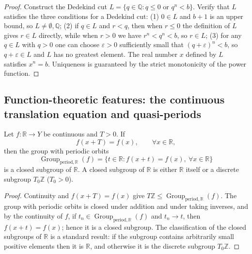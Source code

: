 \begin{proof}
Construct the Dedekind cut $L = \{q \in \mathbb{Q} : q \le 0 \text{ or } q^n < b\}$. Verify that $L$ satisfies the three conditions for a Dedekind cut: (1) $0 \in L$ and $b+1$ is an upper bound, so $L \neq \emptyset, \mathbb{Q}$; (2) if $q \in L$ and $r < q$, then when $r\le0$ the definition of $L$ gives $r\in L$ directly, while when $r > 0$ we have $r^n < q^n < b$, so $r \in L$; (3) for any $q \in L$ with $q > 0$ one can choose $\varepsilon > 0$ sufficiently small that $(q+\varepsilon)^n < b$, so $q+\varepsilon \in L$ and $L$ has no greatest element. The real number $x$ defined by $L$ satisfies $x^n = b$. Uniqueness is guaranteed by the strict monotonicity of the power function.
\end{proof}

\subsection{\texorpdfstring{Function-theoretic features: the continuous translation equation and quasi-periods}{Function-theoretic features: the continuous translation equation and quasi-periods}}

\begin{theorem}\label{thm:translation_equation_R}
Let $f:\mathbb{R}\to Y$ be continuous and $T>0$. If
\[
f(x+T)=f(x),\qquad \forall x\in\mathbb{R},
\]
then the group with periodic orbits
\[
\operatorname{Group}_{\mathrm{period},\mathbb{R}}(f)=\{t\in\mathbb{R}: f(x+t)=f(x),\ \forall x\in\mathbb{R}\}
\]
is a closed subgroup of $\mathbb{R}$. A closed subgroup of $\mathbb{R}$ is either $\mathbb{R}$ itself or a discrete subgroup $T_0\mathbb{Z}$ ($T_0>0$).
\end{theorem}

\begin{proof}
Continuity and $f(x+T)=f(x)$ give $T\mathbb{Z}\le\operatorname{Group}_{\mathrm{period},\mathbb{R}}(f)$. The group with periodic orbits is closed under addition and under taking inverses, and by the continuity of $f$, if $t_n\in\operatorname{Group}_{\mathrm{period},\mathbb{R}}(f)$ and $t_n\to t$, then $f(x+t)=f(x)$; hence it is a closed subgroup. The classification of the closed subgroups of $\mathbb{R}$ is a standard result: if the subgroup contains arbitrarily small positive elements then it is $\mathbb{R}$, and otherwise it is the discrete subgroup $T_0\mathbb{Z}$.
\end{proof}

